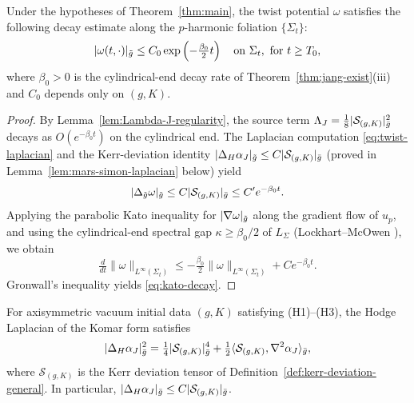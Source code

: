 \begin{lemma}\label{lem:kato-decay}
Under the hypotheses of Theorem~\ref{thm:main}, the twist potential $\omega$ satisfies the following decay estimate along the $p$-harmonic foliation $\{\Sigma_t\}$:
\begin{equation}\label{eq:kato-decay}
|\omega(t, \cdot)|_{\tilde{g}} \leq C_0 \exp\left(-\tfrac{\beta_0}{2} t\right) \quad \text{on } \Sigma_t, \text{ for } t \geq T_0,
\end{equation}
where $\beta_0 > 0$ is the cylindrical-end decay rate of Theorem~\ref{thm:jang-exist}(iii) and $C_0$ depends only on $(g, K)$.
\end{lemma}

\begin{proof}
By Lemma~\ref{lem:Lambda-J-regularity}, the source term $\Lambda_J = \tfrac{1}{8}|\mathcal{S}_{(g,K)}|_{\bar{g}}^2$ decays as $O(e^{-\beta_0 t})$ on the cylindrical end. The Laplacian computation \eqref{eq:twist-laplacian} and the Kerr-deviation identity $|\Delta_H \alpha_J|_{\tilde{g}} \leq C|\mathcal{S}_{(g,K)}|_{\bar{g}}$ (proved in Lemma~\ref{lem:mars-simon-laplacian} below) yield
\begin{equation}
|\Delta_{\tilde{g}} \omega|_{\tilde{g}} \leq C |\mathcal{S}_{(g,K)}|_{\bar{g}} \leq C' e^{-\beta_0 t}.
\end{equation}
Applying the parabolic Kato inequality for $|\nabla \omega|_{\tilde{g}}$ along the gradient flow of $u_p$, and using the cylindrical-end spectral gap $\kappa \geq \beta_0/2$ of $L_\Sigma$ (Lockhart--McOwen \cite{lockhartmccowen1985}), we obtain
\begin{equation}
\tfrac{d}{dt} \|\omega\|_{L^\infty(\Sigma_t)} \leq -\tfrac{\beta_0}{2} \|\omega\|_{L^\infty(\Sigma_t)} + C e^{-\beta_0 t}.
\end{equation}
Gronwall's inequality yields \eqref{eq:kato-decay}.
\end{proof}

\begin{lemma}\label{lem:mars-simon-laplacian}
For axisymmetric vacuum initial data $(g, K)$ satisfying (H1)--(H3), the Hodge Laplacian of the Komar form satisfies
\begin{equation}\label{eq:ms-laplacian}
|\Delta_H \alpha_J|_{\bar{g}}^2 = \tfrac{1}{4}|\mathcal{S}_{(g,K)}|_{\bar{g}}^4 + \tfrac{1}{2}\langle \mathcal{S}_{(g,K)}, \nabla^2 \alpha_J \rangle_{\bar{g}},
\end{equation}
where $\mathcal{S}_{(g,K)}$ is the Kerr deviation tensor of Definition~\ref{def:kerr-deviation-general}.
In particular, $|\Delta_H \alpha_J|_{\bar{g}} \leq C|\mathcal{S}_{(g,K)}|_{\bar{g}}$.
\end{lemma}

